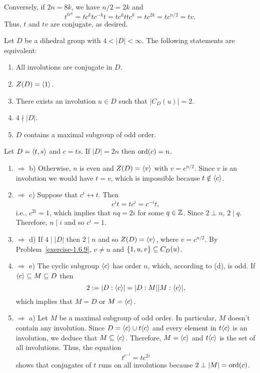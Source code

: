 \begin{solution}
\begin{solution}
Conversely, if $2n=8k$, we have $n/2=2k$ and
$$
    t^{tc^k} = tc^ktc^{-k}t = tc^kttc^k = tc^{2k} = tc^{n/2}=tv.
$$
Thus, $t$ and $tv$ are conjugate, as desired.  \end{solution}

\begin{exr} Let\/ $D$ be a dihedral group with\/ $4<|D|<\infty$. 
    The following statements are equivalent:
    \begin{enumerate}[\rm a)]
    \item All involutions are conjugate in\/ $D$.
    \item $Z(D) = \langle1\rangle$.
    \item There exists an involution\/ $u \in D$ such that\/ $|C_D(u)| = 2$.
    \item $4 \nmid |D|$.
    \item $D$ contains a maximal subgroup of odd order.
    \end{enumerate}
\end{exr}

\begin{solution} Let $D=\langle t,s\rangle$ and $c=ts$. If $|D|=2n$ then ${\rm ord}(c)=n$.

\begin{enumerate}[\rm a)]
    \item $\Rightarrow$ b) Otherwise, $n$ is even and $Z(D)=\langle v\rangle$ with $v=c^{n/2}$. Since $v$ is an involution we would have $t=v$, which is impossible because $t\notin\langle c\rangle$.

    \item $\Rightarrow$ c) Suppose that $c^i\leftrightarrow t$. Then
    $$
        c^it=tc^i=c^{-i}t,
    $$
    i.e., $c^{2i}=1$, which implies that $nq=2i$ for some $q\in\mathbb{Z}$. Since $2\perp n$, $2\mid q$. Therefore, $n\mid i$ and so $c^i=1$.

    \item $\Rightarrow$ d) If $4\mid|D|$ then $2\mid n$ and so $Z(D)=\langle v\rangle$, where $v=c^{n/2}$. By Problem~\ref{exercise-1.6.9}, $v\ne u$ and $\{1,u,v\}\subseteq C_D(u)$.

    \item $\Rightarrow$ e) The cyclic subgroup $\langle c\rangle$ has order $n$, which, according to (d), is odd. If $\langle c\rangle\subseteq M\subseteq D$ then
    $$
        2 := |D:\langle c\rangle| = |D:M||M:\langle c\rangle|,
    $$
    which implies that $M=D$ or $M=\langle c\rangle$.

    \item $\Rightarrow$ a) Let $M$ be a maximal subgroup of odd order. In particular, $M$ doesn't contain any involution. Since $D=\langle c\rangle\cup t\langle c\rangle$ and every element in $t\langle c\rangle$ is an involution, we deduce that $M\subseteq\langle c\rangle$. Therefore, $M=\langle c\rangle$ and $t\langle c\rangle$ is the set of all involutions. Thus, the equation
    $$
        t^{c^{-i}} = tc^{2i}
    $$
    shows that conjugates of $t$ runs on all involutions because $2\perp|M|={\rm ord}(c)$.
\end{enumerate}
\end{solution}


\end{solution}
